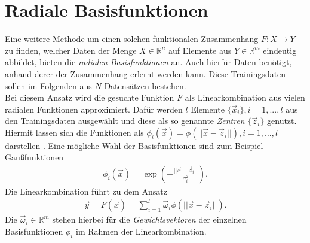 \section{Radiale Basisfunktionen}
Eine weitere Methode um einen solchen funktionalen Zusammenhang $F : X \rightarrow Y$ zu finden, welcher Daten der Menge $X \in \mathbb{R}^n$ auf Elemente aus $Y \in \mathbb{R}^m$ eindeutig abbildet, bieten die \textit{radialen Basisfunktionen} an. Auch hierfür Daten benötigt, anhand derer der Zusammenhang erlernt werden kann. Diese Trainingsdaten sollen im Folgenden aus $N$ Datensätzen bestehen.\\

Bei diesem Ansatz wird die gesuchte Funktion $F$ als Linearkombination aus vielen radialen Funktionen approximiert. Dafür werden $l$ Elemente $\{\vec{x}_i\}, i=1,...,l$ aus den Trainingsdaten ausgewählt und diese als so genannte \textit{Zentren} $\{\vec{z}_i\}$ genutzt. Hiermit lassen sich die Funktionen als $\phi_i(\vec{x}) = \phi(||\vec{x}-\vec{z}_i||), i=1,\ldots ,l$ darstellen \citep{lowe2multi}. Eine mögliche Wahl der Basisfunktionen sind zum Beispiel Gaußfunktionen
\begin{align*}
\phi_i(\vec{x}) = \exp \left( - \frac{||\vec{x}-\vec{z}_i||}{\sigma_i^2} \right).
\end{align*}
Die Linearkombination führt zu dem Ansatz 
\begin{align}
\label{eq:rbf_lincomb}
\vec{y} = F(\vec{x}) = \sum^l_{i=1} \vec{\omega}_i \phi(||\vec{x} - \vec{z}_i||).
\end{align}
Die $\vec{\omega}_i \in \mathbb{R}^m$ stehen hierbei für die \textit{Gewichtsvektoren} der einzelnen Basisfunktionen $\phi_i$ im Rahmen der Linearkombination.\\

